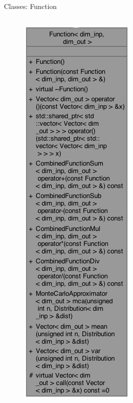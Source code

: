\documentclass[8pt]{beamer}
\begin{document}
\begin{frame}{Classes: Function}
    \begin{columns}
         {\centering \begin{figure} \centering \includegraphics[width=\textwidth]{img/uml_Function.png} \end{figure}}

\end{columns}
\end{frame}
\end{document}
